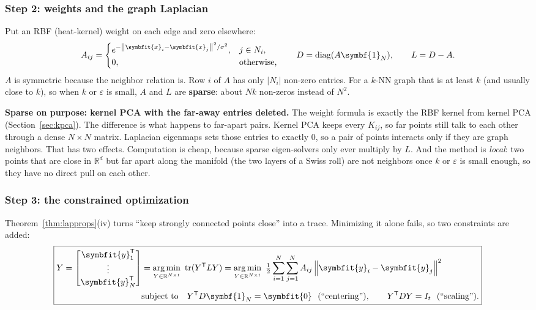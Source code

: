 \documentclass[11pt]{article}
\newcommand{\bm}[1]{\symbfit{#1}}
\newcommand{\R}{\mathbb{R}}
\newcommand{\vx}{\bm{x}}
\newcommand{\one}{\symbf{1}}
\newcommand{\T}{^{\mathsf T}}
\newcommand{\tr}{\operatorname{tr}}
\newcommand{\diag}{\operatorname{diag}}
\newcommand{\norm}[1]{\left\lVert #1\right\rVert}
\DeclareMathOperator*{\argmin}{arg\,min}
\begin{document}
\subsubsection*{Step 2: weights and the graph Laplacian}

Put an RBF (heat-kernel) weight on each edge and zero elsewhere:
\[
A_{ij}=\begin{cases}e^{-\norm{\vx_i-\vx_j}^2/\sigma^2}, & j\in N_i,\\ 0, & \text{otherwise,}\end{cases}
\qquad D=\diag(A\one_N),\qquad L=D-A .
\]
$A$ is symmetric because the neighbor relation is. Row $i$ of $A$ has only $|N_i|$ non-zero entries. For a $k$-NN graph that is at least $k$
(and usually close to $k$), so when $k$ or $\varepsilon$ is small, $A$ and $L$ are \textbf{sparse}: about $Nk$ non-zeros instead of $N^2$.

\begin{intuition}
\textbf{Sparse on purpose: kernel PCA with the far-away entries deleted.} The weight formula is exactly the RBF kernel from kernel PCA (Section~\ref{sec:kpca}). The difference is what happens to far-apart pairs.
Kernel PCA keeps every $K_{ij}$, so far points still talk to each other through a dense $N\times N$ matrix. Laplacian eigenmaps sets those
entries to exactly $0$, so a pair of points interacts only if they are graph neighbors. That has two effects. Computation is cheap, because sparse
eigen-solvers only ever multiply by $L$. And the method is \emph{local}: two points that are close in $\R^d$ but far apart along the
manifold (the two layers of a Swiss roll) are not neighbors once $k$ or $\varepsilon$ is small enough, so they have no direct pull on each other.
\end{intuition}

\subsubsection*{Step 3: the constrained optimization}

Theorem~\ref{thm:lapprops}(iv) turns ``keep strongly connected points close'' into a trace. Minimizing it alone fails, so two constraints are added:
\[
\boxed{\begin{aligned}
Y=\begin{bmatrix}\bm y_1\T\\\vdots\\\bm y_N\T\end{bmatrix}&=\argmin_{Y\in\R^{N\times t}}\ \tr(Y\T LY)=\argmin_{Y\in\R^{N\times t}}\ \tfrac12\sum_{i=1}^N\sum_{j=1}^NA_{ij}\norm{\bm y_i-\bm y_j}^2\\
&\text{subject to}\quad Y\T D\one_N=\bm0\ \ (\text{``centering''}),\qquad Y\T DY=I_t\ \ (\text{``scaling''}).
\end{aligned}}
\]
\end{document}
